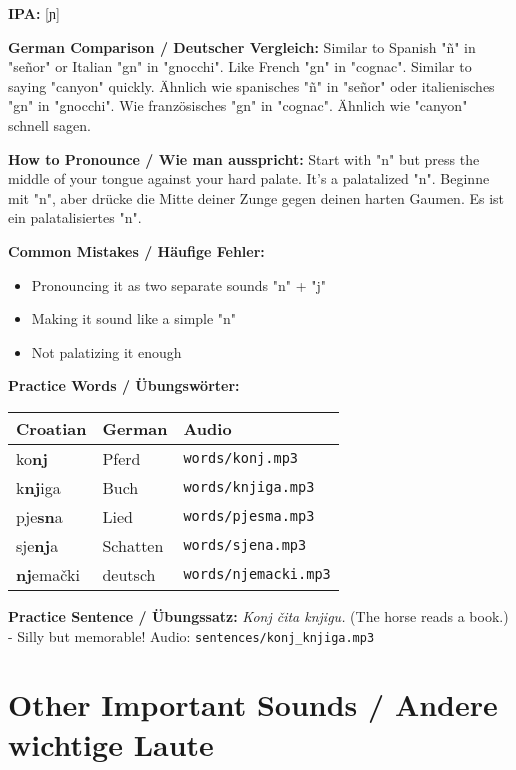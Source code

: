 \begin{tcolorbox}[colback=lightgreen!30, colframe=green!60!black, title=\textbf{Nj, nj}]

\textbf{IPA:} [ɲ]

\textbf{German Comparison / Deutscher Vergleich:}
Similar to Spanish "ñ" in "señor" or Italian "gn" in "gnocchi". Like French "gn" in "cognac". Similar to saying "canyon" quickly.
Ähnlich wie spanisches "ñ" in "señor" oder italienisches "gn" in "gnocchi". Wie französisches "gn" in "cognac". Ähnlich wie "canyon" schnell sagen.

\textbf{How to Pronounce / Wie man ausspricht:}
Start with "n" but press the middle of your tongue against your hard palate. It's a palatalized "n".
Beginne mit "n", aber drücke die Mitte deiner Zunge gegen deinen harten Gaumen. Es ist ein palatalisiertes "n".

\textbf{Common Mistakes / Häufige Fehler:}
\begin{itemize}
    \item Pronouncing it as two separate sounds "n" + "j"
    \item Making it sound like a simple "n"
    \item Not palatizing it enough
\end{itemize}

\textbf{Practice Words / Übungswörter:}
\begin{tabular}{lll}
\textbf{Croatian} & \textbf{German} & \textbf{Audio} \\
\midrule
ko\textbf{nj} & Pferd & \texttt{words/konj.mp3} \\
k\textbf{nj}iga & Buch & \texttt{words/knjiga.mp3} \\
pje\textbf{sn}a & Lied & \texttt{words/pjesma.mp3} \\
sje\textbf{nj}a & Schatten & \texttt{words/sjena.mp3} \\
\textbf{nj}emački & deutsch & \texttt{words/njemacki.mp3} \\
\end{tabular}

\textbf{Practice Sentence / Übungssatz:}
\textit{Konj čita knjigu.}
(The horse reads a book.) - Silly but memorable!
Audio: \texttt{sentences/konj\_knjiga.mp3}

\end{tcolorbox}

\section{Other Important Sounds / Andere wichtige Laute}

